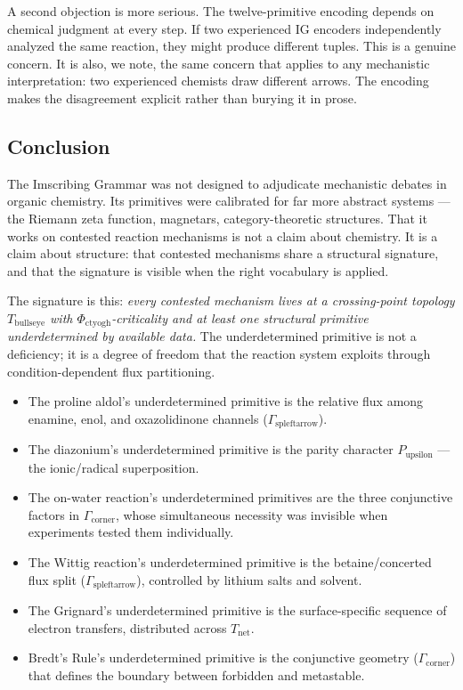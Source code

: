 \documentclass[12pt,a4paper]{article}
\begin{document}
A second objection is more serious. The twelve-primitive encoding depends on chemical judgment at every step. If two experienced IG encoders independently analyzed the same reaction, they might produce different tuples. This is a genuine concern. It is also, we note, the same concern that applies to any mechanistic interpretation: two experienced chemists draw different arrows. The encoding makes the disagreement explicit rather than burying it in prose.

\subsection{Conclusion}

The Imscribing Grammar was not designed to adjudicate mechanistic debates in organic chemistry. Its primitives were calibrated for far more abstract systems --- the Riemann zeta function, magnetars, category-theoretic structures. That it works on contested reaction mechanisms is not a claim about chemistry. It is a claim about structure: that contested mechanisms share a structural signature, and that the signature is visible when the right vocabulary is applied.

The signature is this: \emph{every contested mechanism lives at a crossing-point topology $T_{\text{bullseye}}$ with $\Phi_{\text{ctyogh}}$-criticality and at least one structural primitive underdetermined by available data.} The underdetermined primitive is not a deficiency; it is a degree of freedom that the reaction system exploits through condition-dependent flux partitioning.

\begin{itemize}
    \item The proline aldol's underdetermined primitive is the relative flux among enamine, enol, and oxazolidinone channels ($\Gamma_{\text{spleftarrow}}$).
    \item The diazonium's underdetermined primitive is the parity character $P_{\text{upsilon}}$ --- the ionic/radical superposition.
    \item The on-water reaction's underdetermined primitives are the three conjunctive factors in $\Gamma_{\text{corner}}$, whose simultaneous necessity was invisible when experiments tested them individually.
    \item The Wittig reaction's underdetermined primitive is the betaine/concerted flux split ($\Gamma_{\text{spleftarrow}}$), controlled by lithium salts and solvent.
    \item The Grignard's underdetermined primitive is the surface-specific sequence of electron transfers, distributed across $T_\textrm{net}$.
    \item Bredt's Rule's underdetermined primitive is the conjunctive geometry ($\Gamma_{\text{corner}}$) that defines the boundary between forbidden and metastable.
\end{itemize}
\end{document}
